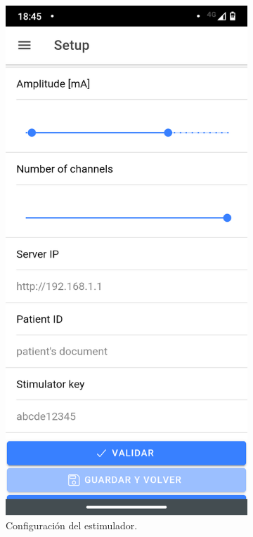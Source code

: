 \begin{figure}
\begin{subfigure}{.5\textwidth}
  \centering
  \includegraphics[width=.8\linewidth]{figs/03_setup.png}
  \caption{Configuración del estimulador.}
  \label{fig:setup}
\end{subfigure}
\begin{subfigure}{.5\textwidth}
  \centering

\end{subfigure}
\end{figure}
